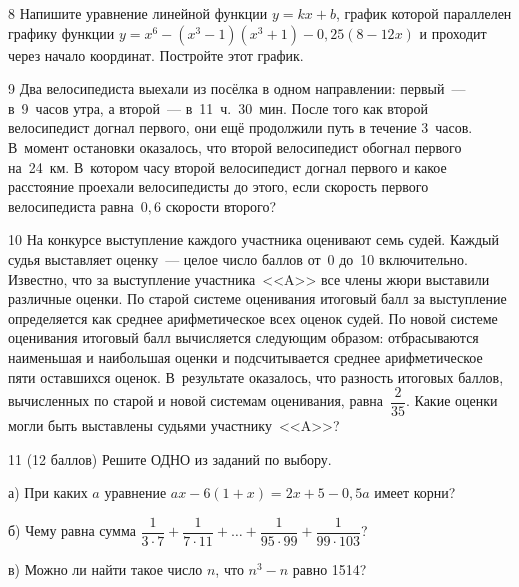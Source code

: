 \smallskip

\begin{problem}{8}
Напишите уравнение линейной функции $y = kx + b$, график которой параллелен графику функции $y = x^6 - (x^3 - 1)(x^3 + 1) - 0{,}25(8 - 12x)$ и проходит через начало координат. Постройте этот график.
\end{problem}

\smallskip

\noindent{}

\smallskip

\begin{problem}{9}
Два велосипедиста выехали из посёлка в одном направлении: первый~--- в~9~часов утра, а второй~--- в~11~ч.~30~мин. После того как второй велосипедист догнал первого, они ещё продолжили путь в течение 3~часов. В~момент остановки оказалось, что второй велосипедист обогнал первого на~24~км. В~котором часу второй велосипедист догнал первого и какое расстояние проехали велосипедисты до этого, если скорость первого велосипедиста равна~$0{,}6$ скорости второго?
\end{problem}

\smallskip

\noindent{}

\smallskip

\begin{problem}{10}
    На конкурсе выступление каждого участника оценивают семь судей. Каждый судья выставляет оценку~--- целое число баллов от~0 до~10 включительно. Известно, что за выступление участника~<<A>> все члены жюри выставили различные оценки. По старой системе оценивания итоговый балл за выступление определяется как среднее арифметическое всех оценок судей. По новой системе оценивания итоговый балл вычисляется следующим образом: отбрасываются наименьшая и наибольшая оценки и подсчитывается среднее арифметическое пяти оставшихся оценок. В~результате оказалось, что разность итоговых баллов, вычисленных по старой и новой системам оценивания, равна~$\dfrac{2}{35}$. Какие оценки могли быть выставлены судьями участнику~<<A>>?
\end{problem}

\bigskip

\rowans{1ex}

\bigskip

\begin{problem}{11 (12 баллов)}
Решите ОДНО из заданий по выбору.

\smallskip

\noindent а) При каких $a$ уравнение $ax-6(1+x)=2x+5-0{,}5a$ имеет корни?

\smallskip

\noindent б) Чему равна сумма $\dfrac{1}{3\cdot7}+\dfrac{1}{7\cdot11}+\dots+\dfrac{1}{95\cdot99}+\dfrac{1}{99\cdot103}$?

\smallskip

\noindent в) Можно ли найти такое число $n$, что $n^3-n$ равно 1514?
\end{problem}

\smallskip

\noindent{}